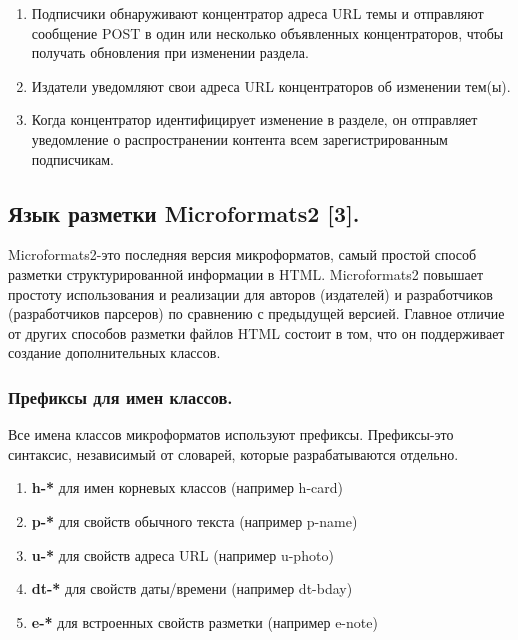 \begin{enumerate}
\def\labelenumi{\arabic{enumi}.}
\tightlist
\item
  Подписчики обнаруживают концентратор адреса URL темы и отправляют
  сообщение POST в один или несколько объявленных концентраторов, чтобы
  получать обновления при изменении раздела.
\item
  Издатели уведомляют свои адреса URL концентраторов об изменении
  тем(ы).
\item
  Когда концентратор идентифицирует изменение в разделе, он отправляет
  уведомление о распространении контента всем зарегистрированным
  подписчикам.
\end{enumerate}

\hypertarget{ux44fux437ux44bux43a-ux440ux430ux437ux43cux435ux442ux43aux438-microformats2-3}{%
\subsection{Язык разметки Microformats2
{[}3{]}.}\label{ux44fux437ux44bux43a-ux440ux430ux437ux43cux435ux442ux43aux438-microformats2-3}}

Microformats2-это последняя версия микроформатов, самый простой способ
разметки структурированной информации в HTML. Microformats2 повышает
простоту использования и реализации для авторов (издателей) и
разработчиков (разработчиков парсеров) по сравнению с предыдущей
версией. Главное отличие от других способов разметки файлов HTML состоит
в том, что он поддерживает создание дополнительных классов.

\hypertarget{ux43fux440ux435ux444ux438ux43aux441ux44b-ux434ux43bux44f-ux438ux43cux435ux43d-ux43aux43bux430ux441ux441ux43eux432}{%
\subsubsection{Префиксы для имен
классов.}\label{ux43fux440ux435ux444ux438ux43aux441ux44b-ux434ux43bux44f-ux438ux43cux435ux43d-ux43aux43bux430ux441ux441ux43eux432}}

Все имена классов микроформатов используют префиксы. Префиксы-это
синтаксис, независимый от словарей, которые разрабатываются отдельно.

\begin{enumerate}
\def\labelenumi{\arabic{enumi}.}
\tightlist
\item
  \textbf{h-*} для имен корневых классов (например h-card)
\item
  \textbf{p-*} для свойств обычного текста (например p-name)
\item
  \textbf{u-*} для свойств адреса URL (например u-photo)
\item
  \textbf{dt-*} для свойств даты/времени (например dt-bday)
\item
  \textbf{e-*} для встроенных свойств разметки (например e-note)
\end{enumerate}

